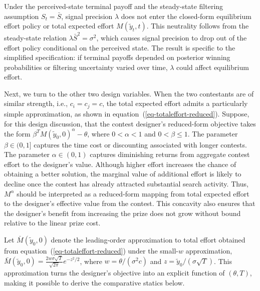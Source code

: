 \documentclass[mnsc]{informs3}
\begin{document}
Under the perceived-state terminal payoff and the steady-state filtering assumption \(S_t=\bar S\), signal precision \(\lambda\) does not enter the closed-form equilibrium effort policy or total expected effort \(M(\tilde y_t,t)\). 
This neutrality follows from the steady-state relation \(\lambda\bar S^2=\sigma^2\), which causes signal precision to drop out of the effort policy conditional on the perceived state. 
The result is specific to the simplified specification: if terminal payoffs depended on posterior winning probabilities or filtering uncertainty varied over time, \(\lambda\) could affect equilibrium effort.

Next, we turn to the other two design variables.
When the two contestants are of similar strength, i.e., $c_i = c_j = c$, the total expected effort admits a particularly simple approximation, as shown in equation~(\ref{eq-totaleffort-reduced}).
Suppose, for this design discussion, that the contest designer's reduced-form objective takes the form $\beta^{T}M(\tilde{y}_0,0)^\alpha-\theta$, where $0<\alpha<1$ and $0<\beta\leq 1$.
The parameter $\beta\in(0,1]$ captures the time cost or discounting associated
with longer contests.
The parameter $\alpha\in(0,1)$ captures diminishing returns from aggregate
contest effort to the designer's value.
Although higher effort increases the chance of obtaining a better solution, the marginal value of additional effort is likely to decline once the contest has already attracted substantial search
activity.
Thus, $M^\alpha$ should be interpreted as a reduced-form mapping from total expected effort to the designer's effective value from the contest.
This concavity also ensures that the designer's benefit from increasing the prize does not grow without bound relative to the linear prize cost.


Let $\bar{M}(\tilde y_0,0)$ denote the leading-order approximation to total effort obtained from equation~(\ref{eq-totaleffort-reduced}) under the small-$w$ approximation, $\bar{M}(\tilde y_0,0) = \frac{2w\sigma\sqrt{T}}{\sqrt{2\pi}}e^{-z^2/2}$, where $w=\theta/(\sigma^2c)$ and $z=\tilde y_0/(\sigma\sqrt{T})$.
This approximation turns the designer's objective into an explicit function of $(\theta,T)$, making it possible to derive the comparative statics below.
\end{document}

